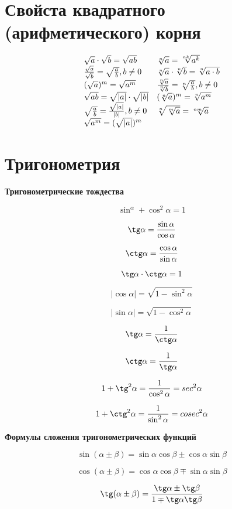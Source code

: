 \documentclass[a4paper, 12pt]{article}
\begin{document}
\section{Свойста квадратного (арифметического) корня}

$$
\begin{array}{ll}
\sqrt{a}\cdot \sqrt{b} = \sqrt{ab}  & \root{n}\of{a}=\root{nk}\of{a^k} \\
\frac{\sqrt{a}}{\sqrt{b}}=\sqrt{\frac{a}{b}}, b\not= 0 & \root{n}\of{a}\cdot \root{n}\of{b}=\root{n}\of{a\cdot b}\\
(\sqrt{a})^m=\sqrt{a^m} & \frac{\root{n}\of{a}}{\root{n}\of{b}}=\root{n}\of{\frac{a}{b}}, b\not=0\\
\sqrt{ab}=\sqrt{|a|}\cdot \sqrt{|b|} & (\root{n}\of{a})^m = \root{n}\of{a^m}\\
\sqrt{\frac{a}{b}}=\frac{\sqrt{|a|}}{|b|}, b\not=0 & \root{n}\of{\root{m}\of{a}} = \root{nm}\of{a}\\
\sqrt{a^m}=(\sqrt{|a|})^m
\end{array}
$$

\section{Тригонометрия}

\textbf{Тригонометрические тождества}

$$\sin^\alpha+\cos^2\alpha=1$$

$$\tg\alpha =\frac{\sin\alpha}{\cos\alpha}$$

$$\ctg\alpha =\frac{\cos\alpha}{\sin\alpha}$$

$$\tg\alpha \cdot \ctg\alpha = 1$$

$$|\cos \alpha |=\sqrt{1-\sin^2\alpha}$$

$$|\sin \alpha |=\sqrt{1-\cos^2\alpha}$$

$$\tg\alpha = \frac{1}{\ctg\alpha}$$

$$\ctg\alpha = \frac{1}{\tg\alpha}$$

$$1+\tg^2\alpha =\frac{1}{\cos^2\alpha}=sec^2\alpha$$

$$1+\ctg^2\alpha =\frac{1}{\sin^2\alpha}=cosec^2\alpha$$

\textbf{Формулы сложения тригонометрических функций}

$$\sin(\alpha \pm \beta )=\sin \alpha \cos \beta \pm \cos \alpha \sin \beta $$

$$\cos(\alpha \pm \beta )=\cos \alpha \cos\beta \mp \sin\alpha\sin\beta$$

$$\tg(\alpha\pm\beta)=\frac{\tg\alpha\pm\tg\beta}{1\mp\tg\alpha\tg\beta}$$
\end{document}
